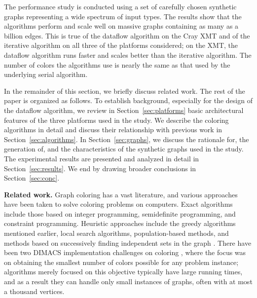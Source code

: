 \documentclass{article}
\begin{document}
The performance study  is conducted using  a set of carefully chosen synthetic graphs 
representing a wide spectrum of input types.
The results show that the algorithms perform and scale well on massive graphs 
containing as many as a billion edges. This is true of the dataflow algorithm on 
the Cray XMT and of the iterative algorithm on all three of the platforms considered;
on the XMT, the dataflow algorithm runs faster and scales better than the iterative algorithm. 
The number of colors the algorithms use is nearly the same as that used
by the underlying serial algorithm.

In the remainder of this section, we briefly discuss related work. 
The rest of the paper is organized as follows.
To establish background, especially for the design of the dataflow algorithm,
we review in Section~\ref{sec:platforms} basic architectural features of the 
three platforms used in the study.
We describe the coloring algorithms in detail and discuss their
relationship with previous work in Section~\ref{sec:algorithms}. 
In Section~\ref{sec:graphs}, we discuss the rationale for, the generation of, 
and the characteristics of the synthetic graphs used in the study.  
The experimental results are presented and analyzed in detail in Section~\ref{sec:results}.
We end by drawing broader conclusions in Section~\ref{sec:conc}.

{\bf Related work. }
Graph coloring has a vast literature, and various approaches have been taken 
to solve coloring problems on computers.
Exact algorithms include those based on integer programming, semidefinite programming, 
and constraint programming.
Heuristic approaches include the greedy algorithms mentioned earlier, local search algorithms,  
population-based methods, and methods based on successively finding independent sets 
in the graph \cite{COLOR03}. 
There have been two DIMACS implementation challenges on coloring \cite{DIMACS}, 
where the focus was on obtaining the smallest number of colors possible for any problem
instance; algorithms merely focused on this objective typically have large running times, 
and as a result they can handle only small instances of graphs, 
often with at most a thousand vertices.
\end{document}

